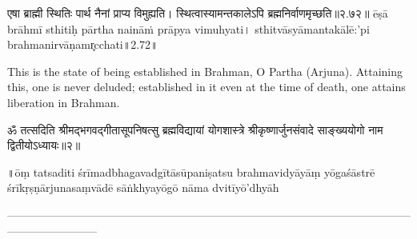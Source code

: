 एषा ब्राह्मी स्थितिः पार्थ नैनां प्राप्य विमुह्यति।
स्थित्वास्यामन्तकालेऽपि ब्रह्मनिर्वाणमृच्छति॥२.७२॥
ēṣā brāhmī sthitiḥ pārtha naināṁ prāpya vimuhyati।
sthitvāsyāmantakālē:'pi brahmanirvāṇamr̥cchati॥2.72॥

This is the state of being established in Brahman, O Partha (Arjuna). Attaining this,  one is never deluded; established in it even at the time of death, one attains liberation in Brahman.

ॐ तत्सदिति श्रीमद्भगवद्गीतासूपनिषत्सु ब्रह्मविद्यायां योगशास्त्रे श्रीकृष्णार्जुनसंवादे साङ्ख्ययोगो नाम द्वितीयोऽध्यायः॥२॥

॥ōṃ tatsaditi śrīmadbhagavadgītāsūpaniṣatsu brahmavidyāyāṃ yōgaśāstrē śrīkṛṣṇārjunasaṃvādē sāṅkhyayōgō nāma dvitīyō'dhyāh

—---------------------------------------------------------------------------------------------------------------------------------
